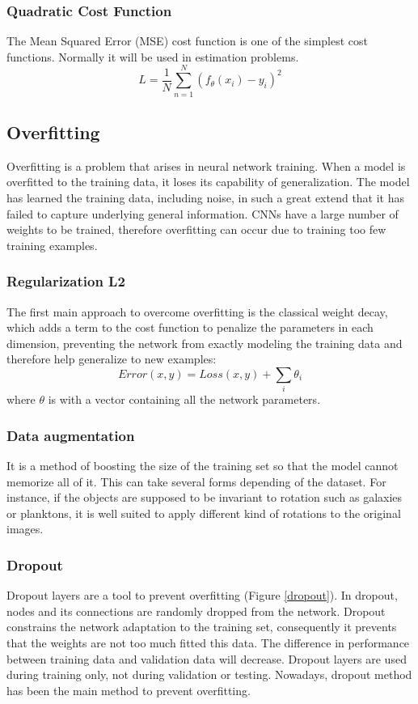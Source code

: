     \subsubsection{Quadratic Cost Function}
    The Mean Squared Error (MSE) cost function is one of the simplest cost functions. Normally it will be used in estimation problems\cite{boureau2008sparse}.
    \begin{equation}
        L =\frac{1}{N}\sum_{n=1}^{N}(f_{\theta}(x_i) - y_i)^2
        \label{eq:mse}
    \end{equation}


    \subsection{Overfitting}
    Overfitting is a problem that arises in neural network training. When a model is overfitted to the training data, it loses its capability of generalization. The model has learned the training data, including noise, in such a great extend that it has failed to capture underlying general information. CNNs have a large number of weights to be trained, therefore overfitting can occur due to training too few training examples. 

    \subsubsection{Regularization  L2}
    The  first  main  approach  to  overcome  overfitting  is  the  classical weight decay, which adds a term to the cost function to penalize the parameters in each dimension, preventing the network from exactly modeling the training data and therefore help generalize to new examples:
    \begin{equation}
        Error(x, y) =  Loss(x, y) + \sum_{i}\theta_i
    \end{equation}
    where $\theta$ is with a vector containing all the network parameters.
    \subsubsection{Data augmentation}
    It is a method of boosting the size of the training set so that the model cannot memorize all of it.  This can take several forms depending of the dataset. For  instance,  if  the  objects  are  supposed  to  be  invariant  to  rotation  such  as  galaxies  or planktons, it is well suited to apply different kind of rotations to the original images.

    \subsubsection{Dropout}
    Dropout layers\cite{srivastava2014dropout} are a tool to prevent overfitting (Figure \ref{dropout}). In dropout, nodes and its connections are randomly dropped from the network. Dropout constrains the network adaptation to the training set, consequently it prevents that the weights are not too much fitted this data. The difference in performance between training data and validation data will decrease. Dropout layers are used during training only, not during validation or testing. Nowadays, dropout method has been the main method to prevent overfitting.

